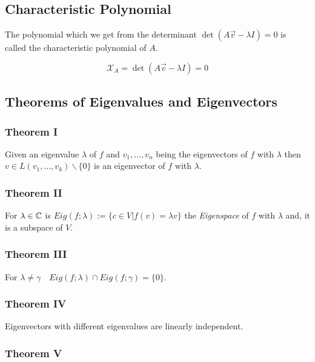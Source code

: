 \subsection{Characteristic Polynomial}

The polynomial which we get from the determinant \(\det (A\vec{v} - \lambda I)  = 0\) is called 
the characteristic polynomial of \(A\).

\[
    \mathcal{X}_A = \det (A\vec{v} - \lambda I) = 0
\]

\subsection{Theorems of Eigenvalues and Eigenvectors}

\subsubsection{Theorem I}

Given an eigenvalue \(\lambda\) of \(f\) and \(v_1, \dots, v_n\) being the eigenvectors of \(f\) 
with \(\lambda\) then \(v \in L(v_1, \dots, v_k) \backslash \{0\}\) is an eigenvector of 
\(f\) with \(\lambda\).
\vspace{\baselineskip}

\subsubsection{Theorem II}

For \(\lambda \in \mathbb{C}\) is \(Eig(f;\lambda):= \{c \in V | f(v) = \lambda v\}\) the \emph{Eigenspace} of 
\(f\) with \(\lambda\) and, it is a subspace of \(V\).

\subsubsection{Theorem III}

For \(\lambda \ne \gamma \quad Eig(f;\lambda) \cap Eig(f;\gamma) = \{0\}\).

\subsubsection{Theorem IV}

Eigenvectors with different eigenvalues are linearly independent.

\subsubsection{Theorem V}

